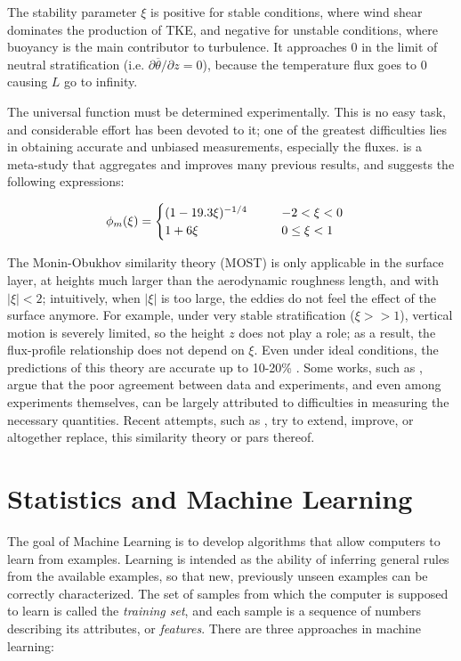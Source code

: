 \documentclass[a4paper,11pt]{kth-mag}
\begin{document}
The stability parameter $\xi$ is positive for stable conditions, where wind shear dominates the production of TKE, and negative for unstable conditions, where buoyancy is the main contributor to turbulence. It approaches 0 in the limit of neutral stratification (i.e. $\partial\overline{\theta}/\partial z=0$), because the temperature flux goes to 0 causing $L$ go to infinity.

The universal function must be determined experimentally. This is no easy task, and considerable effort has been devoted to it; one of the greatest difficulties lies in obtaining accurate and unbiased measurements, especially the fluxes. \cite{hogstrom88} is a meta-study that aggregates and improves many previous results, and suggests the following expressions:

\begin{align}
\phi_m(\xi)&=\begin{cases}
\label{eq:phi_m_coeff}
\mathrlap{(1-19.3\xi)^{-1/4}} \hphantom{0.95(1-11.6\xi)^{-1/2}} & -2<\xi<0 \\
1+6\xi & 0\leq\xi<1\\
\end{cases}
\end{align}

The Monin-Obukhov similarity theory (MOST) is only applicable in the surface layer, at heights much larger than the aerodynamic roughness length, and with $\vert\xi\vert<2$; intuitively, when $\vert\xi\vert$ is too large, the eddies do not feel the effect of the surface anymore. For example, under very stable stratification ($\xi>>1$), vertical motion is severely limited, so the height $z$ does not play a role; as a result, the flux-profile relationship does not depend on $\xi$. Even under ideal conditions, the predictions of this theory are accurate up to 10-20\% \citep{50years}. Some works, such as \cite{flux_prof_measure_issues}, argue that the poor agreement between data and experiments, and even among experiments themselves, can be largely attributed to difficulties in measuring the necessary quantities. Recent attempts, such as \citep{sheba_phim,most_teal,Wilson2008,aerodynamic_fluxes}, try to extend, improve, or altogether replace, this similarity theory or pars thereof.

\section{Statistics and Machine Learning}
\label{sec:ml}
The goal of Machine Learning is to develop algorithms that allow computers to learn from examples. Learning is intended as the ability of inferring general rules from the available examples, so that new, previously unseen examples can be correctly characterized. The set of samples from which the computer is supposed to learn is called the \emph{training set}, and each sample is a sequence of numbers describing its attributes, or \emph{features}. There are three approaches in machine learning:
\end{document}
